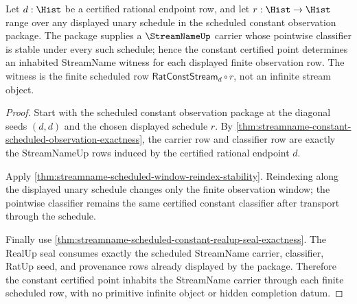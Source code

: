 \begin{theorem}
\label{thm:streamname-constant-pointwise-inhabited}
Let $d:\Hist$ be a certified rational endpoint row, and let
$r:\Hist\to\Hist$ range over any displayed unary schedule in the scheduled
constant observation package. The package supplies a $\StreamNameUp$ carrier
whose pointwise classifier is stable under every such schedule; hence the
constant certified point determines an inhabited StreamName witness for each
displayed finite observation row. The witness is the finite scheduled row
$\mathsf{RatConstStream}_d\circ r$, not an infinite stream object.
\end{theorem}
\begin{proof}
Start with the scheduled constant observation package at the diagonal seeds
$(d,d)$ and the chosen displayed schedule $r$. By
\autoref{thm:streamname-constant-scheduled-observation-exactness}, the carrier
row and classifier row are exactly the StreamNameUp rows induced by the
certified rational endpoint $d$.

Apply \autoref{thm:streamname-scheduled-window-reindex-stability}. Reindexing
along the displayed unary schedule changes only the finite observation window;
the pointwise classifier remains the same certified constant classifier after
transport through the schedule.

Finally use
\autoref{thm:streamname-scheduled-constant-realup-seal-exactness}. The RealUp
seal consumes exactly the scheduled StreamName carrier, classifier, RatUp seed,
and provenance rows already displayed by the package. Therefore the constant
certified point inhabits the StreamName carrier through each finite scheduled
row, with no primitive infinite object or hidden completion datum.
\end{proof}
